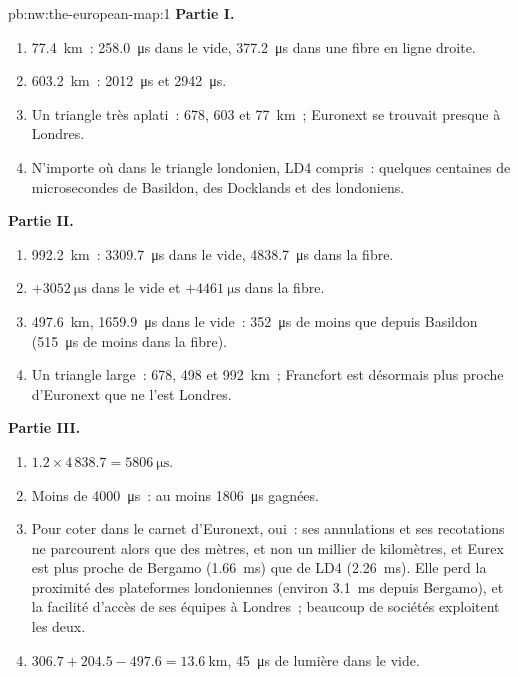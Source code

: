 \begin{solution}{pb:nw:the-european-map:1}
\textbf{Partie I.}
\begin{enumerate}
\item \qty{77.4}{\kilo\metre}~: \qty{258.0}{\micro\second} dans le vide, \qty{377.2}{\micro\second} dans une fibre en ligne droite.
\item \qty{603.2}{\kilo\metre}~: \qty{2012}{\micro\second} et \qty{2942}{\micro\second}.
\item Un triangle très aplati~: 678, 603 et \qty{77}{\kilo\metre}~; Euronext se trouvait presque à Londres.
\item N'importe où dans le triangle londonien, LD4 compris~: quelques centaines de microsecondes de Basildon, des Docklands et des  londoniens.
\end{enumerate}
\textbf{Partie II.}
\begin{enumerate}[resume]
\item \qty{992.2}{\kilo\metre}~: \qty{3309.7}{\micro\second} dans le vide, \qty{4838.7}{\micro\second} dans la fibre.
\item $+\qty{3052}{\micro\second}$ dans le vide et $+\qty{4461}{\micro\second}$ dans la fibre.
\item \qty{497.6}{\kilo\metre}, \qty{1659.9}{\micro\second} dans le vide~: \qty{352}{\micro\second} de moins que depuis Basildon
  (\qty{515}{\micro\second} de moins dans la fibre).
\item Un triangle large~: 678, 498 et \qty{992}{\kilo\metre}~; Francfort est désormais plus proche d'Euronext que ne l'est Londres.
\end{enumerate}
\textbf{Partie III.}
\begin{enumerate}[resume]
\item $1.2 \times 4\,838.7 = \qty{5806}{\micro\second}$.
\item Moins de \qty{4000}{\micro\second}~: au moins \qty{1806}{\micro\second} gagnées.
\item Pour coter dans le carnet d'Euronext, oui~: ses annulations et ses recotations ne parcourent alors que des mètres, et non un millier de kilomètres, et Eurex est plus proche de Bergamo
  (\qty{1.66}{\milli\second}) que de LD4 (\qty{2.26}{\milli\second}). Elle perd la proximité des plateformes londoniennes (environ \qty{3.1}{\milli\second}
  depuis Bergamo), et la facilité d'accès de ses équipes à Londres~; beaucoup de sociétés exploitent les deux.
\item $306.7 + 204.5 - 497.6 = \qty{13.6}{\kilo\metre}$, \qty{45}{\micro\second} de lumière dans le vide.

\end{enumerate}
\end{solution}
